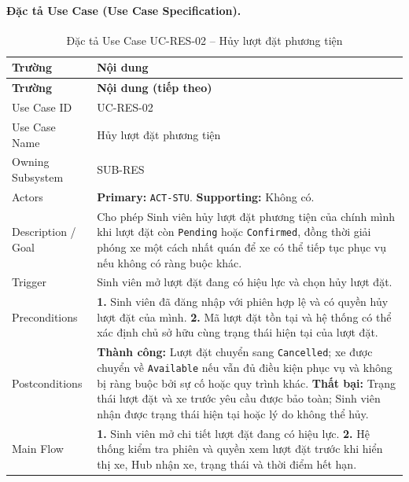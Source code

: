 \paragraph{Đặc tả Use Case (Use Case Specification).}
\small
\begin{longtable}{|L{42mm}|L{102mm}|}
  \caption{Đặc tả Use Case UC-RES-02 -- Hủy lượt đặt phương tiện}\label{tab:spec-UC-RES-02}\\
  \hline
  \centering\arraybackslash\textbf{Trường} & \centering\arraybackslash\textbf{Nội dung}\\
  \hline
  \endfirsthead
  \hline
  \centering\arraybackslash\textbf{Trường} & \centering\arraybackslash\textbf{Nội dung (tiếp theo)}\\
  \hline
  \endhead
  Use Case ID & UC-RES-02\\\hline
  Use Case Name & Hủy lượt đặt phương tiện\\\hline
  Owning Subsystem & SUB-RES\\\hline
  Actors & \textbf{Primary:} \texttt{ACT-STU}. \textbf{Supporting:} Không có.\\\hline
  Description / Goal & Cho phép Sinh viên hủy lượt đặt phương tiện của chính mình khi lượt đặt còn \texttt{Pending} hoặc \texttt{Confirmed}, đồng thời giải phóng xe một cách nhất quán để xe có thể tiếp tục phục vụ nếu không có ràng buộc khác.\\\hline
  Trigger & Sinh viên mở lượt đặt đang có hiệu lực và chọn hủy lượt đặt.\\\hline
  Preconditions &
    \textbf{1.} Sinh viên đã đăng nhập với phiên hợp lệ và có quyền hủy lượt đặt của mình.\newline
    \textbf{2.} Mã lượt đặt tồn tại và hệ thống có thể xác định chủ sở hữu cùng trạng thái hiện tại của lượt đặt.\\\hline
  Postconditions &
    \textbf{Thành công:} Lượt đặt chuyển sang \texttt{Cancelled}; xe được chuyển về \texttt{Available} nếu vẫn đủ điều kiện phục vụ và không bị ràng buộc bởi sự cố hoặc quy trình khác.\newline
    \textbf{Thất bại:} Trạng thái lượt đặt và xe trước yêu cầu được bảo toàn; Sinh viên nhận được trạng thái hiện tại hoặc lý do không thể hủy.\\\hline
  Main Flow &
    \textbf{1.} Sinh viên mở chi tiết lượt đặt đang có hiệu lực.\newline
    \textbf{2.} Hệ thống kiểm tra phiên và quyền xem lượt đặt trước khi hiển thị xe, Hub nhận xe, trạng thái và thời điểm hết hạn.\newline

\end{longtable}
